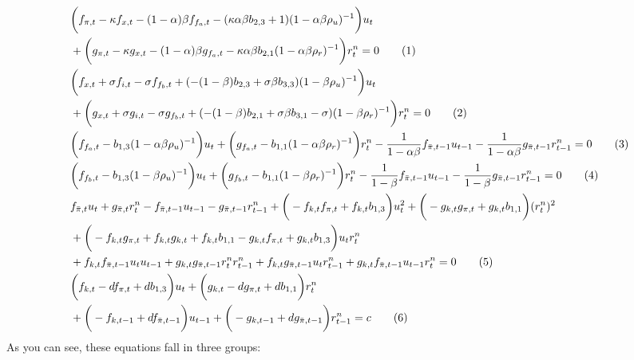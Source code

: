 \documentclass[11pt]{article}
\renewcommand{\[}{\begin{equation}}
\renewcommand{\]}{\end{equation}}
\newcommand\numberthis{\addtocounter{equation}{1}\tag{\theequation}} %
\begin{document}
\begin{align*}
& \bigg(f_{\pi,t}-\kappa f_{x,t}-(1-\alpha)\beta f_{f_a,t}-(\kappa\alpha\beta b_{2,3}+1)(1-\alpha\beta\rho_u)^{-1}\bigg)u_t \\
&+ \bigg( g_{\pi,t}-\kappa g_{x,t}-(1-\alpha)\beta g_{f_a,t}-\kappa\alpha\beta b_{2,1}(1-\alpha\beta\rho_r)^{-1} \bigg)r_t^n  = 0 \label{9} \numberthis \\
& \bigg(f_{x,t} + \sigma f_{i,t} -\sigma f_{f_b,t} + (-(1-\beta)b_{2,3}+\sigma\beta b_{3,3})(1-\beta\rho_u)^{-1}\bigg)u_t \\
&+ \bigg(g_{x,t} + \sigma g_{i,t} -\sigma g_{f_b,t} + (-(1-\beta)b_{2,1}+\sigma\beta b_{3,1}-\sigma)(1-\beta\rho_r)^{-1} \bigg)r_t^n   = 0 \label{10}\numberthis \\
& \bigg(f_{f_a,t}-b_{1,3}(1-\alpha\beta\rho_u)^{-1}\bigg)u_t + \bigg(g_{f_a,t}-b_{1,1}(1-\alpha\beta\rho_r)^{-1} \bigg)r_t^n  -\frac{1}{1-\alpha\beta}f_{\bar{\pi}, t-1}u_{t-1} -\frac{1}{1-\alpha\beta}g_{\bar{\pi}, t-1} r_{t-1}^n = 0 \label{11} \numberthis \\
& \bigg(f_{f_b,t}-b_{1,3}(1-\beta\rho_u)^{-1}\bigg)u_t + \bigg(g_{f_b,t}-b_{1,1}(1-\beta\rho_r)^{-1} \bigg)r_t^n  -\frac{1}{1-\beta}f_{\bar{\pi}, t-1}u_{t-1} -\frac{1}{1-\beta}g_{\bar{\pi}, t-1} r_{t-1}^n  = 0 \label{12}\numberthis \\
& f_{\bar{\pi},t}u_t + g_{\bar{\pi},t}r_t^{n} -f_{\bar{\pi},t-1}u_{t-1} -g_{\bar{\pi},t-1}r_{t-1}^n + \bigg(-f_{k,t}f_{\pi,t} + f_{k,t}b_{1,3}\bigg)u_t^2 + \bigg(-g_{k,t}g_{\pi,t} + g_{k,t}b_{1,1}\bigg)(r_t^n)^2 \\
& + \bigg(-f_{k,t}g_{\pi,t} + f_{k,t}g_{k,t} + f_{k,t}b_{1,1}-g_{k,t}f_{\pi,t}+g_{k,t}b_{1,3}\bigg)u_tr_t^n \\
& + f_{k,t}f_{\bar{\pi},t-1}u_tu_{t-1} +  g_{k,t}g_{\bar{\pi},t-1}r_t^n r_{t-1}^n +  f_{k,t}g_{\bar{\pi},t-1}u_t r_{t-1}^n +  g_{k,t}f_{\bar{\pi},t-1}u_{t-1}r_t^n  = 0 \label{13} \numberthis \\
& \bigg(f_{k,t} - df_{\pi,t} + db_{1,3}\bigg)u_t + \bigg( g_{k,t} - dg_{\pi,t} + db_{1,1} \bigg)r_t^n \\
& + \bigg( -f_{k,t-1}+df_{\bar{\pi},t-1}\bigg)u_{t-1} +\bigg(-g_{k,t-1}+dg_{\bar{\pi},t-1} \bigg)r_{t-1}^n  = c \label{14} \numberthis
\end{align*}
As you can see, these equations fall in three groups:
\end{document}

